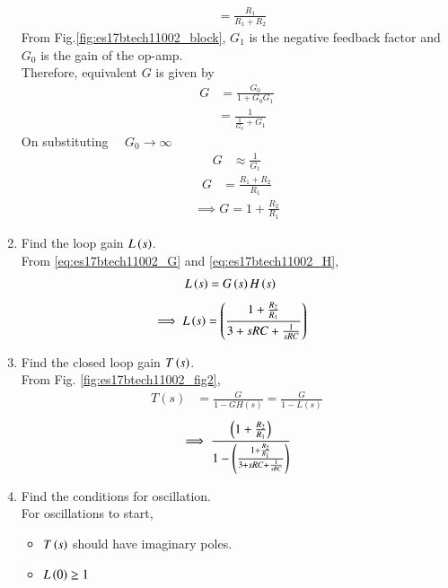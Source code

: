 \begin{enumerate}[label=\arabic*.,ref=\theenumi]
\begin{align}
&= \frac{R_{1}}{R_{1} + R_{2}}
\label{eq:es17btech11002_G1}
\end{align}
From Fig.\ref{fig:es17btech11002_block}, $G_{1}$ is the negative feedback factor and $G_{0}$ is the gain of the op-amp.\\ 
Therefore, equivalent $G$ is given by
\begin{align}
G &= \frac{G_{0}}{1+G_{0}G_{1}}
\end{align}
\begin{align}
&= \frac{1}{\frac{1}{G_{0}} + G_{1}}
\end{align}
On substituting $\quad G_{0}\to\infty$
\begin{align}
G&\approx \frac{1}{G_{1}}
\end{align}
\begin{align}
G &= \frac{R_{1}+R_{2}}{R_{1}}
\end{align}
\begin{align}
\implies G=1+\frac{R_{2}}{R_{1}}
\label{eq:es17btech11002_G}
\end{align}
%
\item Find the loop gain $L\left(s\right)$.\\
\solution 
From \eqref{eq:es17btech11002_G}
and \eqref{eq:es17btech11002_H},
\begin{align}
L\left(s\right) &= G\left(s\right)H\left(s\right)
\end{align}
\begin{align}
\implies L\brak{s} &= \brak{\frac{1+\frac{R_{2}}{R_{1}}}{3+sRC+\frac{1}{sRC}}}
\label{eq:es17btech11002_4}
\end{align}
%
\item Find the closed loop gain $T\left(s\right)$.
\\
\solution From Fig. \ref{fig:es17btech11002_fig2},
%
\begin{align}
T(s) &= \frac{G}{1-GH(s)}=\frac{G}{1-L(s)}
\end{align}
\begin{align}
\implies \frac{\left(1+\frac{R_2}{R_1}\right)}{1-\left(\frac{1+\frac{R_{2}}{R_{1}}}{3+sRC+\frac{1}{sRC}}\right)}
\end{align}
\item Find the conditions for oscillation.\\
\solution For oscillations to start, 
\begin{itemize}
    \item $T\left(s\right)$ should have imaginary poles.
    \item $L\left(0\right) \ge 1$
\end{itemize}

\end{enumerate}
